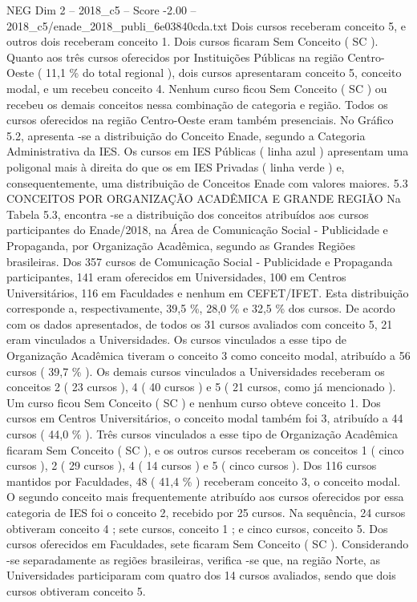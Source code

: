 \begin{textsample}{NEG Dim 2 – 2018\_c5 – Score -2.00 – 2018\_c5/enade\_2018\_publi\_6e03840cda.txt}
Dois cursos receberam conceito 5, e outros dois receberam conceito 1.
Dois cursos ficaram Sem Conceito ( SC ).
Quanto aos três cursos oferecidos por Instituições Públicas na região Centro-Oeste ( 11,1 \% do total regional ), dois cursos apresentaram conceito 5, conceito modal, e um recebeu conceito 4.
Nenhum curso ficou Sem Conceito ( SC ) ou recebeu os demais conceitos nessa combinação de categoria e região.
Todos os cursos oferecidos na região Centro-Oeste eram também presenciais.
No Gráfico 5.2, apresenta -se a distribuição do Conceito Enade, segundo a Categoria Administrativa da IES.
Os cursos em IES Públicas ( linha azul ) apresentam uma poligonal mais à direita do que os em IES Privadas ( linha verde ) e, consequentemente, uma distribuição de Conceitos Enade com valores maiores. 5.3 CONCEITOS POR ORGANIZAÇÃO ACADÊMICA E GRANDE REGIÃO Na Tabela 5.3, encontra -se a distribuição dos conceitos atribuídos aos cursos participantes do Enade/2018, na Área de Comunicação Social - Publicidade e Propaganda, por Organização Acadêmica, segundo as Grandes Regiões brasileiras.
Dos 357 cursos de Comunicação Social - Publicidade e Propaganda participantes, 141 eram oferecidos em Universidades, 100 em Centros Universitários, 116 em Faculdades e nenhum em CEFET/IFET.
Esta distribuição corresponde a, respectivamente, 39,5 \%, 28,0 \% e 32,5 \% dos cursos.
De acordo com os dados apresentados, de todos os 31 cursos avaliados com conceito 5, 21 eram vinculados a Universidades.
Os cursos vinculados a esse tipo de Organização Acadêmica tiveram o conceito 3 como conceito modal, atribuído a 56 cursos ( 39,7 \% ).
Os demais cursos vinculados a Universidades receberam os conceitos 2 ( 23 cursos ), 4 ( 40 cursos ) e 5 ( 21 cursos, como já mencionado ).
Um curso ficou Sem Conceito ( SC ) e nenhum curso obteve conceito 1.
Dos cursos em Centros Universitários, o conceito modal também foi 3, atribuído a 44 cursos ( 44,0 \% ).
Três cursos vinculados a esse tipo de Organização Acadêmica ficaram Sem Conceito ( SC ), e os outros cursos receberam os conceitos 1 ( cinco cursos ), 2 ( 29 cursos ), 4 ( 14 cursos ) e 5 ( cinco cursos ).
Dos 116 cursos mantidos por Faculdades, 48 ( 41,4 \% ) receberam conceito 3, o conceito modal.
O segundo conceito mais frequentemente atribuído aos cursos oferecidos por essa categoria de IES foi o conceito 2, recebido por 25 cursos.
Na sequência, 24 cursos obtiveram conceito 4 ; sete cursos, conceito 1 ; e cinco cursos, conceito 5.
Dos cursos oferecidos em Faculdades, sete ficaram Sem Conceito ( SC ).
Considerando -se separadamente as regiões brasileiras, verifica -se que, na região Norte, as Universidades participaram com quatro dos 14 cursos avaliados, sendo que dois cursos obtiveram conceito 5.

\end{textsample}
